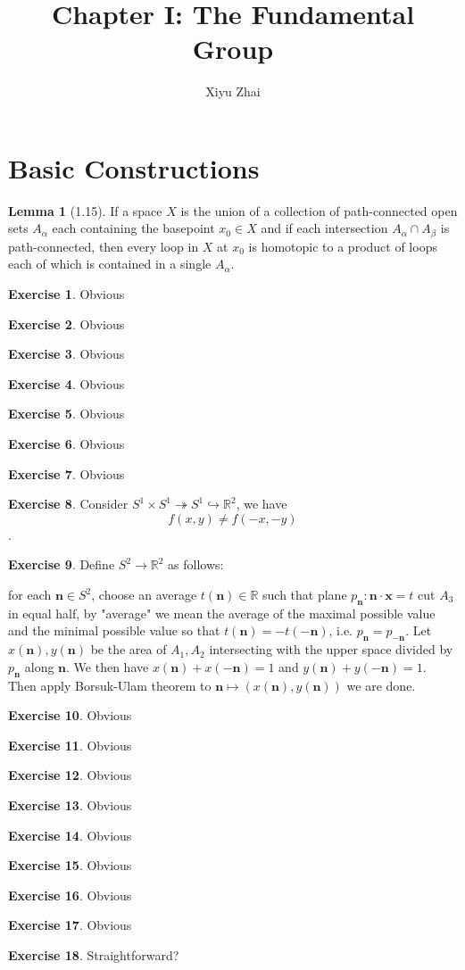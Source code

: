 \documentclass[11pt, oneside]{article}   	%
\title{Chapter I: The Fundamental Group}
\author{Xiyu Zhai}
\date{}							%
\theoremstyle{definition}
\newtheorem{ex}{Exercise}
{\theoremstyle{plain}
\newtheorem*{rmk}{Remark}
\newtheorem*{rmks}{Remarks}
\newtheorem*{lt}{Last time}
}
\newtheorem*{lem}{Lemma}
\begin{document}
\maketitle
\tableofcontents
\section{Basic Constructions}
\begin{lem}[1.15]
	If a space $X$ is the union of a collection of path-connected open sets $A_\alpha$ each containing the basepoint $x_0\in X$ and if each intersection $A_\alpha\cap A_\beta$ is path-connected, then every loop in $X$ at $x_0$ is homotopic to a product of loops each of which is contained in a single $A_\alpha$.
\end{lem}
\begin{ex}
	Obvious
\end{ex}
\begin{ex}
	Obvious
\end{ex}
\begin{ex}
	Obvious
\end{ex}
\begin{ex}
	Obvious
\end{ex}
\begin{ex}
	Obvious
\end{ex}
\begin{ex}
	Obvious
\end{ex}
\begin{ex}
	Obvious
\end{ex}
\begin{ex}
	Consider $S^1\times S^1\twoheadrightarrow S^1\hookrightarrow \mathbb{R}^2$, we have
	\begin{equation}
		f(x,y)\neq f(-x,-y)
	\end{equation}.
\end{ex}
\begin{ex}
	Define $S^2\to \mathbb{R}^2$ as follows:

	for each $\bm{n}\in S^2$, choose an average $t(\bm{n})\in \mathbb{R}$ such that plane $p_{\bm{n}}:\bm{n}\cdot \bm{x}=t$ cut $A_3$ in equal half, by "average" we mean the average of the maximal possible value and the minimal possible value so that $t(\bm{n})=-t(-\bm{n})$, i.e. $p_{\bm{n}}=p_{-\bm{n}}$. Let $x(\bm{n}),y(\bm{n})$ be the area of $A_1,A_2$ intersecting with the upper space divided by $p_{\bm{n}}$ along $\bm{n}$. We then have $x(\bm{n})+x(-\bm{n})=1$ and $y(\bm{n})+y(-\bm{n})=1$. Then apply Borsuk-Ulam theorem to $\bm{n}\mapsto (x(\bm{n}),y(\bm{n}))$ we are done.
\end{ex}
\begin{ex}
	Obvious
\end{ex}
\begin{ex}
	Obvious
\end{ex}
\begin{ex}
	Obvious
\end{ex}
\begin{ex}
	Obvious
\end{ex}
\begin{ex}
	Obvious
\end{ex}
\begin{ex}
	Obvious
\end{ex}
\begin{ex}
	Obvious
\end{ex}
\begin{ex}
	Obvious
\end{ex}
\begin{ex}
	Straightforward?
\end{ex}
\end{document}
